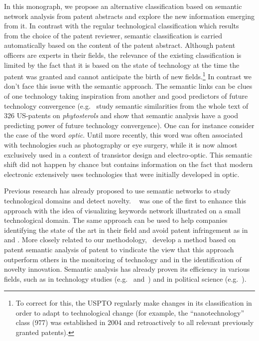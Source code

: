 \documentclass[article]{article}%
\begin{document}
In this monograph, we propose an alternative classification based on semantic network analysis from patent abstracts and explore the new information emerging from it. In contrast with the regular technological classification which results from the choice of the patent reviewer, semantic classification is carried automatically based on the content of the patent abstract. Although patent officers are experts in their fields, the relevance of the existing classification is limited by the fact that it is based on the state of technology at the time the patent was granted and cannot anticipate the birth of new fields.\footnote{To correct for this, the USPTO regularly make changes in its classification in order to adapt to technological change (for example, the ``nanotechnology'' class (977) was established in 2004 and  retroactively to all relevant previously granted patents).} In contrast we don't face this issue with the semantic approach. The semantic links can be clues of one technology taking inspiration from another and  good predictors of future technology convergence (e.g.~\citealt{preschitschek2013} study semantic similarities from the whole text of 326 US-patents on \textit{phytosterols} and show that semantic analysis have a good predicting power of future technology convergence). One can for instance consider the case of the word \textit{optic}. Until more recently, this word was often associated with technologies such as photography or eye surgery, while it is now almost exclusively used in a context of transistor design and electro-optic. This semantic shift did not happen by chance but contains information on the fact that modern electronic extensively uses technologies that were initially developed in optic. 

Previous research has already proposed to use semantic networks to study technological domains and detect novelty. ~\citet{yoon2004text} was one of the first to enhance this approach with the idea of visualizing keywords network illustrated on a small technological domain. The same approach can be used to help companies identifying the state of the art in their field and avoid patent infringement as in \citet{park2014semantic} and \citet{yoon2011detecting}. More closely related to our methodology,~\citet{gerken2012new} develop a method based on patent semantic analysis of patent to vindicate the view that this approach outperform others in the monitoring of technology and in the identification of novelty innovation. Semantic analysis has already proven its efficiency in various fields, such as in technology studies (e.g.~\citealt{choi2014patent} and~\citealt{fattori2003text}) and in political science (e.g.~\citealt{2015arXiv151003797G}).
\end{document}
